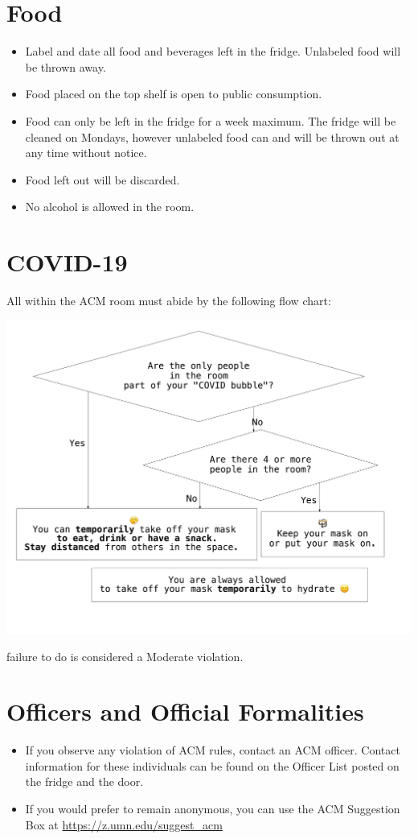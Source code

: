 \section{Food}
\begin{itemize}
	\item Label and date all food and beverages left in the fridge. Unlabeled food will be thrown away.
	\item Food placed on the top shelf is open to public consumption.
	\item Food can only be left in the fridge for a week maximum. The fridge will be cleaned on Mondays, however unlabeled food can and will be thrown out at any time without notice.
	\item Food left out will be discarded.
	\item No alcohol is allowed in the room.
\end{itemize}

\section{COVID-19}
All within the ACM room must abide by the following flow chart:

\begin{center}
    \includegraphics[scale=.175]{covidChart}
\end{center}

failure to do is considered a Moderate violation.

\section{Officers and Official Formalities}
\begin{itemize}
	\item If you observe any violation of ACM rules, contact an ACM officer. Contact information for these individuals can be found on the Officer List posted on the fridge and the door.
	\item If you would prefer to remain anonymous, you can use the ACM Suggestion Box at \url{https://z.umn.edu/suggest_acm}
\end{itemize}

